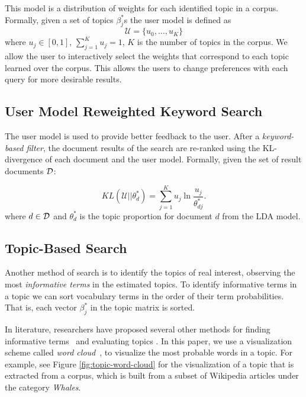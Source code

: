 This model is a distribution of weights for each identified topic in 
a corpus. Formally, given a set of topics $\beta_j^{*}$s the user 
model is defined as
$$
\mathcal{U} = \{u_0, \ldots, u_{K}\}
$$
where $u_j \in [0,1]$, $\sum_{j = 1}^K u_j = 1$, $K$ is the number 
of topics in the corpus.
We allow the user to interactively select the weights that correspond to
each topic learned over the corpus. This allows the users to change preferences with each query
for more desirable results.

\subsection{User Model Reweighted Keyword Search}
The user model is used to provide better feedback to
the user. After a \textsl{keyword-based filter}, the document results of the search 
are re-ranked using the KL-divergence of each document and the
user model. Formally, given the set of result documents $\cal D$:

\begin{equation} \label{eq:KL}
KL(\mathcal{U}||\theta^*_{d}) = \sum_{j = 1}^K u_j \ln \frac{u_j}{\theta^*_{dj}}.
\end{equation}
where $d \in {\cal D}$ and $\theta^*_{d}$ is the topic proportion 
for document $d$ from the LDA model. 


\subsection{Topic-Based Search}

Another method of search is to identify the topics of 
real interest, observing the most \textsl{informative terms} in 
the estimated topics. 
To identify informative terms in a topic we can sort vocabulary 
terms in the order of their term probabilities.
That is, each vector $\beta_j^{*}$ in the topic matrix is sorted.
  
In literature, researchers have proposed several other methods for 
finding informative terms~\cite{2012-termite} and evaluating topics 
\cite{mimno2011optimizing}. In this paper, we use a visualization 
scheme called \textsl{word cloud}~\cite{Davis2013}, to visualize the 
most probable words in a topic. For example, see Figure 
\ref{fig:topic-word-cloud} for the visualization of a topic that is 
extracted from a corpus, which is built from a subset of Wikipedia 
articles under the category \textsl{Whales}. 
       
